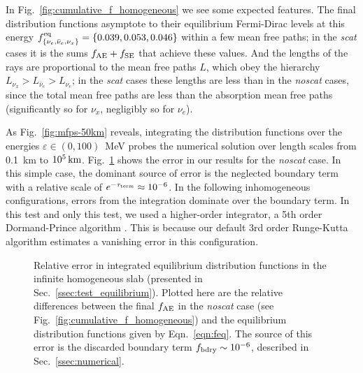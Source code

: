 \documentclass[aps,floatfix,prd,superscriptaddress,twocolumn]{revtex4-1}
\begin{document}
In Fig.~\ref{fig:cumulative_f_homogeneous} we see some expected features.
The final distribution functions asymptote to their equilibrium Fermi-Dirac
levels at this energy
$f^{\rm eq}_{\{\nu_e,\bar{\nu}_e,\nu_x\}}=\{0.039, 0.053, 0.046\}$
within a few mean free paths;
in the \emph{scat} cases it is the sums $f_{\rm AE}+f_{\rm SE}$ that
achieve these values.
And the lengths of the rays are proportional to the mean free paths $L$,
which obey the hierarchy $L_{\nu_x}>L_{\bar{\nu}_e}>L_{\nu_e}$;
in the \emph{scat} cases these lengths are less than in the \emph{noscat} cases,
since the total mean free paths are less than the absorption mean free paths
(significantly so for $\nu_x$, negligibly so for $\nu_e$).

As Fig.~\ref{fig:mfps-50km} reveals, integrating the distribution functions
over the energies $\varepsilon\in(0,100)$~MeV
probes the numerical solution over length scales from
0.1~km to $10^{5}\,{\rm km}$.
Fig.~\ref{fig:homogeneous_isotropic} shows the error in our results for
the \emph{noscat} case.
In this simple case, the dominant source of error is the neglected
boundary term with a relative scale of $e^{-\tau_{\rm term}}\approx10^{-6}$.
In the following inhomogeneous configurations,
errors from the integration dominate over the boundary term.
In this test and only this test, we used a higher-order integrator, a 5th
order Dormand-Prince algorithm \cite{pres2007-nr_3rd_ed}. This is because
our default 3rd order Runge-Kutta algorithm estimates a vanishing error
in this configuration.

\begin{figure}
  \resizebox{\columnwidth}{!}{}
  \caption{Relative error in integrated equilibrium distribution functions
    in the infinite homogeneous slab
    (presented in Sec.~\ref{ssec:test_equilibrium}).
    Plotted here are the relative differences between the final
    $f_{\rm AE}$ in the \emph{noscat} case
    (see Fig.~\ref{fig:cumulative_f_homogeneous})
    and the equilibrium distribution functions given by
    Eqn.~\ref{eqn:feq}.
    The source of this error is the discarded boundary term
    $f_{\rm bdry}\sim10^{-6}$, described in Sec.~\ref{ssec:numerical}.
  }
  \label{fig:homogeneous_isotropic}
\end{figure}
\end{document}
